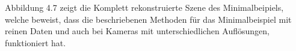 \pagebreak
Abbildung 4.7 zeigt die Komplett rekonstruierte Szene des Minimalbeipiels, welche beweist, dass die beschriebenen Methoden für das Minimalbeispiel mit reinen Daten und auch bei Kameras mit unterschiedlichen Auflösungen, funktioniert hat. 

%
%
%
%
%
%
%
%
%
%
%
